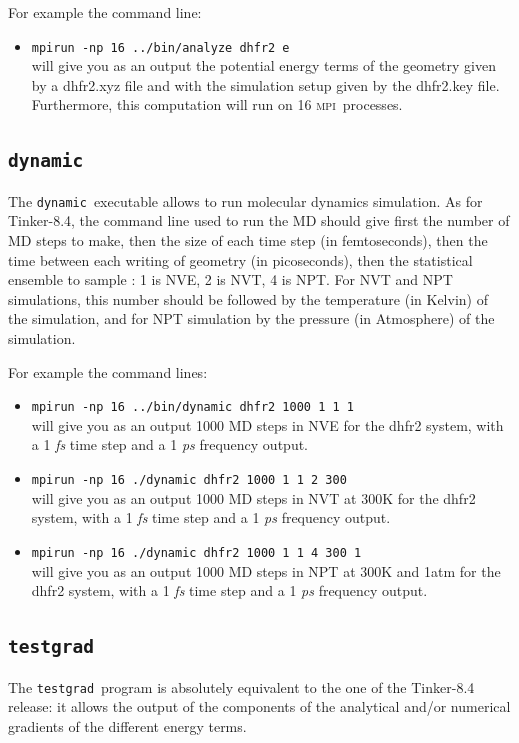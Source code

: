 \documentclass[peerreview]{IEEEtran}
\def\mpi{\textsc{mpi}}
\def\dynamic{\texttt{dynamic}}
\def\testgrad{\texttt{testgrad}}
\def\mpirun{\texttt{mpirun -np}}
\begin{document}
For example the command line: 
\begin{itemize}
\item[] \mpirun\texttt{ 16 ../bin/analyze dhfr2 e} \\
will give you as an output the potential energy terms of the geometry given by a dhfr2.xyz file and with the simulation setup given by the dhfr2.key file. Furthermore, this computation will run on 16 \mpi\  processes.
\end{itemize}
\subsection{\dynamic\ }
The \dynamic\ executable allows to run molecular dynamics simulation. As for Tinker-8.4, the command line used to run the MD should give first the number of MD steps to make, then the size of each time step (in femtoseconds), then the time between each writing of geometry (in picoseconds), then the statistical ensemble to sample : 1 is NVE, 2 is NVT, 4 is NPT. For NVT and NPT simulations, this number should be followed by the temperature (in Kelvin) of the simulation, and for NPT simulation by the pressure (in Atmosphere) of the simulation.

For example the command lines:
\begin{itemize}
    \item[] \mpirun\texttt{  16 ../bin/dynamic dhfr2 1000 1 1 1} \\
    will give you as an output 1000 MD steps in NVE for the dhfr2 system, with a 1  {\em fs} time step and a 1 {\em ps} frequency output.
    \item[] \mpirun\texttt{  16 ./dynamic dhfr2 1000 1 1 2 300} \\
    will give you as an output 1000 MD steps in NVT at 300K for the dhfr2 system, with a 1  {\em fs} time step and a 1  {\em ps} frequency output.
    \item[] \mpirun\texttt{  16 ./dynamic dhfr2 1000 1 1 4 300 1} \\
    will give you as an output 1000 MD steps in NPT at 300K and 1atm for the dhfr2 system, with a 1  {\em fs} time step and a 1  {\em ps} frequency output.
\end{itemize}
\subsection{\testgrad\ }
The \testgrad\ program is absolutely equivalent to the one of the Tinker-8.4 release: it allows the output of the components of the analytical and/or numerical gradients of the different energy terms.
\end{document}
